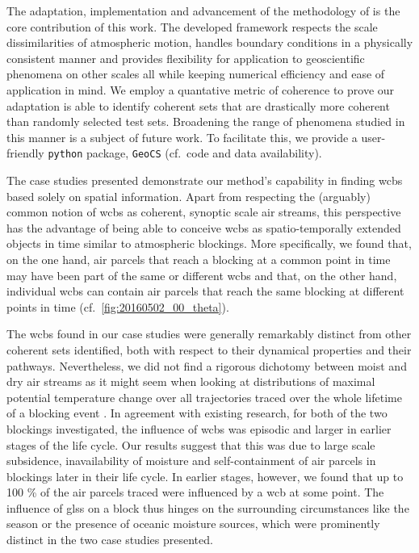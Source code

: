 The adaptation, implementation and advancement of the methodology of \textcite{banischUnderstandingGeometryTransport2017} is the core contribution of this work. The developed framework respects the scale dissimilarities of atmospheric motion, handles boundary conditions in a physically consistent manner and provides flexibility for application to geoscientific phenomena on other scales all while keeping numerical efficiency and ease of application in mind. We employ a quantative metric of coherence to prove our adaptation is able to identify coherent sets that are drastically more coherent than randomly selected test sets. Broadening the range of phenomena studied in this manner is a subject of future work. To facilitate this, we provide a user-friendly \texttt{python} package, \texttt{GeoCS} (cf.~code and data availability).

The case studies presented demonstrate our method's capability in finding \glspl{wcb} based solely on spatial information. Apart from respecting the (arguably) common notion of \glspl{wcb} as coherent, synoptic scale air streams, this perspective has the advantage of being able to conceive \glspl{wcb} as spatio-temporally extended objects in time similar to atmospheric blockings. More specifically, we found that, on the one hand, air parcels that reach a blocking at a common point in time may have been part of the same or different \glspl{wcb} and that, on the other hand, individual \glspl{wcb} can contain air parcels that reach the same blocking at different points in time (cf.~\cref{fig:20160502_00_theta}).

The \glspl{wcb}  found in our case studies were generally remarkably distinct from other coherent sets identified, both with respect to their dynamical properties and their pathways. Nevertheless, we did not find a rigorous dichotomy between moist and dry air streams as it might seem when looking at distributions of maximal potential temperature change over all trajectories traced over the whole lifetime of a blocking event \parencite{steinfeldResponseMoistDry2022, steinfeldRoleLatentHeating2019, pfahlImportanceLatentHeat2015}. In agreement with existing research, for both of the two blockings investigated, the influence of \glspl{wcb} was episodic and larger in earlier stages of the life cycle. Our results suggest that this was due to large scale subsidence, inavailability of moisture and self-containment of air parcels in blockings later in their life cycle. In earlier stages, however, we found that up to 100 \% of the air parcels traced were influenced by a \gls{wcb} at some point. The influence of \glspl{gls} on a block thus hinges on the surrounding circumstances like the season or the presence of oceanic moisture sources, which were prominently distinct in the two case studies presented.

